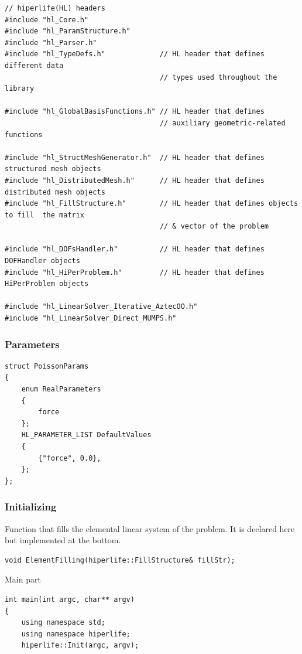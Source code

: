 \documentclass[]{article}
\begin{document}
\begin{lstlisting}
// hiperlife(HL) headers
#include "hl_Core.h"
#include "hl_ParamStructure.h"
#include "hl_Parser.h"
#include "hl_TypeDefs.h"             // HL header that defines different data
                                     // types used throughout the library
                                     
#include "hl_GlobalBasisFunctions.h" // HL header that defines
                                     // auxiliary geometric-related functions
                                     
#include "hl_StructMeshGenerator.h"  // HL header that defines structured mesh objects
#include "hl_DistributedMesh.h"      // HL header that defines distributed mesh objects
#include "hl_FillStructure.h"        // HL header that defines objects to fill  the matrix
                                     // & vector of the problem
                                     
#include "hl_DOFsHandler.h"          // HL header that defines DOFHandler objects
#include "hl_HiPerProblem.h"         // HL header that defines HiPerProblem objects

#include "hl_LinearSolver_Iterative_AztecOO.h"
#include "hl_LinearSolver_Direct_MUMPS.h"
\end{lstlisting}
\subsubsection{Parameters} \label{sec: ppr}
\begin{lstlisting}[firstnumber=21]
struct PoissonParams
{
	enum RealParameters
	{
		force
	};	
	HL_PARAMETER_LIST DefaultValues
	{
		{"force", 0.0},
	};
};
\end{lstlisting}

\subsubsection{Initializing} \label{sec: main}
Function that fills the elemental linear system of the problem. It is declared here but implemented at the bottom.
\begin{lstlisting}[firstnumber=32]
void ElementFilling(hiperlife::FillStructure& fillStr);
\end{lstlisting}
Main part
\begin{lstlisting}[firstnumber=33]
int main(int argc, char** argv)
{
	using namespace std;
	using namespace hiperlife;
	hiperlife::Init(argc, argv);
\end{lstlisting}
\end{document}
